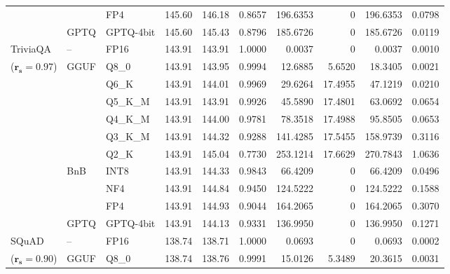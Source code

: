 \begin{longtable}{ll l rrrrrrr}
 &  & FP4 & 145.60 & 146.18 & \cellcolor{red!18} 0.8657 & \cellcolor{red!18} 196.6353 & \cellcolor{cyan!12} $0$ & \cellcolor{red!18} 196.6353 & \cellcolor{red!18} 0.0798 \\
 & GPTQ & GPTQ-4bit & 145.60 & 145.43 & \cellcolor{red!18} 0.8796 & \cellcolor{red!18} 185.6726 & \cellcolor{cyan!12} $0$ & \cellcolor{red!18} 185.6726 & \cellcolor{red!18} 0.0119 \\
\midrule
TriviaQA & -- & FP16 & 143.91 & 143.91 & 1.0000 & 0.0037 & \cellcolor{cyan!12} $0$ & 0.0037 & 0.0010 \\
{\small ($\mathbf{r_s{=}0.97}$)} & GGUF & Q8\_0 & 143.91 & 143.95 & 0.9994 & 12.6885 & 5.6520 & 18.3405 & 0.0021 \\
 &  & Q6\_K & 143.91 & 144.01 & 0.9969 & 29.6264 & 17.4955 & 47.1219 & 0.0210 \\
 &  & Q5\_K\_M & 143.91 & 143.91 & 0.9926 & 45.5890 & 17.4801 & 63.0692 & 0.0654 \\
 &  & Q4\_K\_M & 143.91 & 144.00 & 0.9781 & 78.3518 & 17.4988 & 95.8505 & 0.0653 \\
 &  & Q3\_K\_M & 143.91 & 144.32 & \cellcolor{red!18} 0.9288 & \cellcolor{red!18} 141.4285 & 17.5455 & \cellcolor{red!18} 158.9739 & \cellcolor{red!18} 0.3116 \\
 &  & Q2\_K & 143.91 & 145.04 & \cellcolor{red!35} 0.7730 & \cellcolor{red!35} 253.1214 & 17.6629 & \cellcolor{red!35} 270.7843 & \cellcolor{red!35} 1.0636 \\
 & BnB & INT8 & 143.91 & 144.33 & 0.9843 & 66.4209 & \cellcolor{cyan!12} $0$ & 66.4209 & 0.0496 \\
 &  & NF4 & 143.91 & 144.84 & \cellcolor{red!18} 0.9450 & \cellcolor{red!18} 124.5222 & \cellcolor{cyan!12} $0$ & \cellcolor{red!18} 124.5222 & \cellcolor{red!18} 0.1588 \\
 &  & FP4 & 143.91 & 144.93 & \cellcolor{red!18} 0.9044 & \cellcolor{red!18} 164.2065 & \cellcolor{cyan!12} $0$ & \cellcolor{red!18} 164.2065 & \cellcolor{red!18} 0.3070 \\
 & GPTQ & GPTQ-4bit & 143.91 & 144.13 & \cellcolor{red!18} 0.9331 & \cellcolor{red!18} 136.9950 & \cellcolor{cyan!12} $0$ & \cellcolor{red!18} 136.9950 & \cellcolor{red!18} 0.1271 \\
\midrule
SQuAD & -- & FP16 & 138.74 & 138.71 & 1.0000 & 0.0693 & \cellcolor{cyan!12} $0$ & 0.0693 & 0.0002 \\
{\small ($\mathbf{r_s{=}0.90}$)} & GGUF & Q8\_0 & 138.74 & 138.76 & 0.9991 & 15.0126 & 5.3489 & 20.3615 & 0.0031 \\

\end{longtable}

